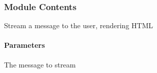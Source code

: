 \documentclass[letterpaper,10pt,english]{sphinxmanual}
\begin{document}
\subsubsection{Module Contents}
\label{\detokenize{autoapi/ui/index:module-contents}}

\begin{fulllineitems}
\label{\detokenize{autoapi/ui/index:ui.informal_name}}
\pysigstartsignatures
{}
\pysigstopsignatures
\end{fulllineitems}


\begin{fulllineitems}
\label{\detokenize{autoapi/ui/index:ui.stream_message}}
\pysigstartsignatures
{}
\pysigstopsignatures
\sphinxAtStartPar
Stream a message to the user, rendering HTML


\paragraph{Parameters}
\label{\detokenize{autoapi/ui/index:parameters}}\begin{description}
\sphinxAtStartPar
The message to stream

\end{description}

\end{fulllineitems}

\end{document}
